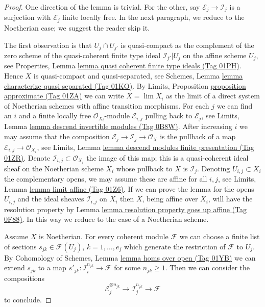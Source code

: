 \documentclass{amsart}
\theoremstyle{plain}
\theoremstyle{definition}
\theoremstyle{remark}
\numberwithin{equation}{subsection}
\def\lim{\mathop{\mathrm{lim}}\nolimits}
\begin{document}
\begin{proof}
One direction of the lemma is trivial. For the other, 
say $\mathcal{E}_j \to \mathcal{I}_j$ is a surjection with
$\mathcal{E}_j$ finite locally free. In the next paragraph, we
reduce to the Noetherian case; we suggest the reader skip it.

\medskip\noindent
The first observation is that $U_j \cap U_{j'}$ is quasi-compact
as the complement of the zero scheme of the quasi-coherent finite type ideal
$\mathcal{I}_{j'}|{U_j}$ on the affine scheme $U_j$, see
Properties, Lemma \href{https://stacks.math.columbia.edu/tag/01PH}{lemma quasi coherent finite type ideals (Tag 01PH)}.
Hence $X$ is quasi-compact and quasi-separated, see
Schemes, Lemma \href{https://stacks.math.columbia.edu/tag/01KO}{lemma characterize quasi separated (Tag 01KO)}.
By Limits, Proposition \href{https://stacks.math.columbia.edu/tag/01ZA}{proposition approximate (Tag 01ZA)}
we can write $X = \lim X_i$ as the limit of a direct system of
Noetherian schemes with affine transition morphisms. For each $j$
we can find an $i$ and a finite locally free $\mathcal{O}_{X_i}$-module
$\mathcal{E}_{i, j}$ pulling back to $\mathcal{E}_j$, see
Limits, Lemma \href{https://stacks.math.columbia.edu/tag/0B8W}{lemma descend invertible modules (Tag 0B8W)}.
After increasing $i$ we may assume that the composition
$\mathcal{E}_j \to \mathcal{I}_j \to \mathcal{O}_X$ is the
pullback of a map $\mathcal{E}_{i, j} \to \mathcal{O}_{X_i}$, see
Limits, Lemma \href{https://stacks.math.columbia.edu/tag/01ZR}{lemma descend modules finite presentation (Tag 01ZR)}.
Denote $\mathcal{I}_{i, j} \subset \mathcal{O}_{X_i}$ the image
of this map; this is a quasi-coherent ideal sheaf on the Noetherian
scheme $X_i$ whose pullback to $X$ is $\mathcal{I}_j$.
Denoting $U_{i, j} \subset X_i$ the complementary opens, we
may assume these are affine for all $i, j$, see
Limits, Lemma \href{https://stacks.math.columbia.edu/tag/01Z6}{lemma limit affine (Tag 01Z6)}.
If we can prove the lemma for the opens $U_{i, j}$ and the
ideal sheaves $\mathcal{I}_{i, j}$ on $X_i$ then $X$, being affine
over $X_i$, will have the resolution property by
Lemma \href{https://stacks.math.columbia.edu/tag/0F88}{lemma resolution property goes up affine (Tag 0F88)}.
In this way we reduce to the case of a Noetherian scheme.

\medskip\noindent
Assume $X$ is Noetherian. For every coherent module $\mathcal{F}$
we can choose a finite list of sections $s_{jk} \in \mathcal{F}(U_j)$,
$k = 1, \ldots, e_j$ which generate the restriction of $\mathcal{F}$ to $U_j$.
By Cohomology of Schemes, Lemma \href{https://stacks.math.columbia.edu/tag/01YB}{lemma homs over open (Tag 01YB)}
we can extend $s_{jk}$ to a map
$s'_{jk} : \mathcal{I}_i^{n_{jk}} \to \mathcal{F}$ for some $n_{jk} \geq 1$.
Then we can consider the compositions
$$
\mathcal{E}_j^{\otimes n_{jk}} \to \mathcal{I}_j^{n_{jk}} \to \mathcal{F}
$$
to conclude.
\end{proof}
\end{document}
